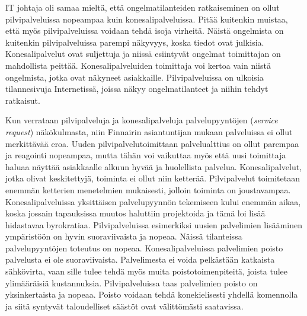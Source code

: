 IT johtaja oli samaa mieltä, että ongelmatilanteiden ratkaiseminen on ollut pilvipalveluissa nopeampaa kuin konesalipalveluissa. Pitää kuitenkin muistaa, että myös pilvipalveluissa voidaan tehdä isoja virheitä. Näistä ongelmista on kuitenkin pilvipalveluissa parempi näkyvyys, koska tiedot ovat julkisia. Konesalipalvelut ovat suljettuja ja niissä esiintyvät ongelmat toimittajan on mahdollista peittää. Konesalipalveluiden toimittaja voi kertoa vain niistä ongelmista, jotka ovat näkyneet asiakkaille. Pilvipalveluissa on ulkoisia tilannesivuja Internetissä, joissa näkyy ongelmatilanteet ja niihin tehdyt ratkaisut.

Kun verrataan pilvipalveluja ja konesalipalveluja palvelupyyntöjen (\emph{service request}) näkökulmasta, niin Finnairin asiantuntijan mukaan palveluissa ei ollut merkittävää eroa. Uuden pilvipalvelutoimittaan palvelualttius on ollut parempaa ja reagointi nopeampaa, mutta tähän voi vaikuttaa myös että uusi toimittaja haluaa näyttää asiakkaalle alkuun hyvää ja huolellista palvelua. Konesalipalvelut, jotka olivat keskitettyjä, toiminta ei ollut niin ketterää. Pilvipalvelut toimitetaan enemmän ketterien menetelmien mukaisesti, jolloin toiminta on joustavampaa. Konesalipalveluissa yksittäisen palvelupyynnön tekemiseen kului enemmän aikaa, koska jossain tapauksissa muutos haluttiin projektoida ja tämä loi lisää hidastavaa byrokratiaa. Pilvipalveluissa esimerkiksi uusien palvelimien lisääminen ympäristöön on hyvin suoraviivaista ja nopeaa. Näissä tilanteissa palvelupyyntöjen toteutus on nopeaa. Konesalipalveluissa palvelimien poisto palvelusta ei ole suoraviivaista. Palvelimesta ei voida pelkästään katkaista sähkövirta, vaan sille tulee tehdä myös muita poistotoimenpiteitä, joista tulee ylimääräisiä kustannuksia. Pilvipalveluissa taas palvelimien poisto on yksinkertaista ja nopeaa. Poisto voidaan tehdä konekielisesti yhdellä komennolla ja siitä syntyvät taloudelliset säästöt ovat välittömästi saatavissa.

